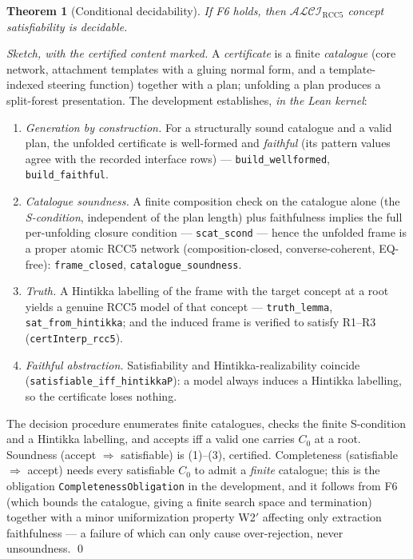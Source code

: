 \documentclass[11pt]{article}
\newcommand{\ALCIRCC}{\mathcal{ALCI}_{\mathrm{RCC5}}}
\newcommand{\code}[1]{\texttt{#1}}
\theoremstyle{plain}
\newtheorem{theorem}{Theorem}
\theoremstyle{definition}
\begin{document}
\begin{theorem}[Conditional decidability]\label{thm:conditional}
If F6 holds, then $\ALCIRCC$ concept satisfiability is decidable.
\end{theorem}

\noindent\emph{Sketch, with the certified content marked.}
A \emph{certificate} is a finite \emph{catalogue} (core network,
attachment templates with a gluing normal form, and a template-indexed
steering function) together with a plan; unfolding a plan produces a
split-forest presentation. The development establishes, \emph{in the
Lean kernel}:
\begin{enumerate}[leftmargin=1.6em,itemsep=1pt]
\item \emph{Generation by construction.} For a structurally sound
catalogue and a valid plan, the unfolded certificate is well-formed and
\emph{faithful} (its pattern values agree with the recorded interface
rows) --- \code{build\_wellformed}, \code{build\_faithful}.
\item \emph{Catalogue soundness.} A finite composition check on the
catalogue alone (the \emph{S-condition}, independent of the plan length)
plus faithfulness implies the full per-unfolding closure condition ---
\code{scat\_scond} --- hence the unfolded frame is a proper atomic RCC5
network (composition-closed, converse-coherent, EQ-free):
\code{frame\_closed}, \code{catalogue\_soundness}.
\item \emph{Truth.} A Hintikka labelling of the frame with the target
concept at a root yields a genuine RCC5 model of that concept ---
\code{truth\_lemma}, \code{sat\_from\_hintikka}; and the induced frame
is verified to satisfy R1--R3 (\code{certInterp\_rcc5}).
\item \emph{Faithful abstraction.} Satisfiability and
Hintikka-realizability coincide (\code{satisfiable\_iff\_hintikkaP}): a
model always induces a Hintikka labelling, so the certificate loses
nothing.
\end{enumerate}
The decision procedure enumerates finite catalogues, checks the finite
S-condition and a Hintikka labelling, and accepts iff a valid one
carries $C_0$ at a root. Soundness (accept $\Rightarrow$ satisfiable) is
(1)--(3), certified. Completeness (satisfiable $\Rightarrow$ accept)
needs every satisfiable $C_0$ to admit a \emph{finite} catalogue; this
is the obligation \code{CompletenessObligation} in the development, and
it follows from F6 (which bounds the catalogue, giving a finite search
space and termination) together with a minor uniformization property
W2$'$ affecting only extraction faithfulness --- a failure of which can
only cause over-rejection, never unsoundness. \qed
\end{document}
